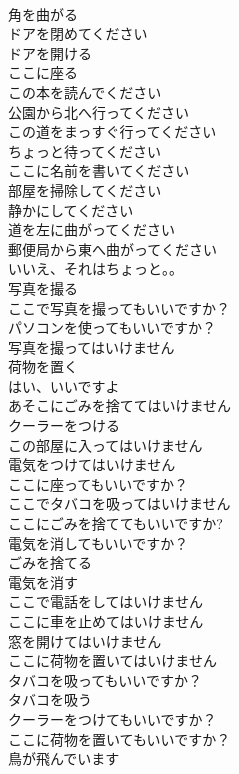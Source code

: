\documentclass[8pt]{extreport}
\begin{document}
\begin{CJK}{UTF8}{min}
\\	角を曲がる	
\\	ドアを閉めてください	
\\	ドアを開ける	
\\	ここに座る	
\\	この本を読んでください	
\\	公園から北へ行ってください	
\\	この道をまっすぐ行ってください	
\\	ちょっと待ってください	
\\	ここに名前を書いてください	
\\	部屋を掃除してください	
\\	静かにしてください	
\\	道を左に曲がってください	
\\	郵便局から東へ曲がってください	
\\	いいえ、それはちょっと。。	
\\	写真を撮る	
\\	ここで写真を撮ってもいいですか？	
\\	パソコンを使ってもいいですか？	
\\	写真を撮ってはいけません	
\\	荷物を置く	
\\	はい、いいですよ	
\\	あそこにごみを捨ててはいけません	
\\	クーラーをつける	
\\	この部屋に入ってはいけません	
\\	電気をつけてはいけません	
\\	ここに座ってもいいですか？	
\\	ここでタバコを吸ってはいけません	
\\	ここにごみを捨ててもいいですか?	
\\	電気を消してもいいですか？	
\\	ごみを捨てる	
\\	電気を消す	
\\	ここで電話をしてはいけません	
\\	ここに車を止めてはいけません	
\\	窓を開けてはいけません	
\\	ここに荷物を置いてはいけません	
\\	タバコを吸ってもいいですか？	
\\	タバコを吸う	
\\	クーラーをつけてもいいですか？	
\\	ここに荷物を置いてもいいですか？	
\\	鳥が飛んでいます	

\end{CJK}
\end{document}
